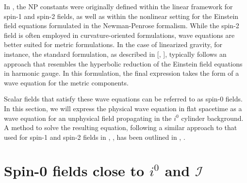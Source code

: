 In \cite{NewPen68}, the NP constants were originally defined within the linear framework for spin-1 and spin-2 fields, as well as within the nonlinear setting for the Einstein field equations formulated in the Newman-Penrose formalism.
While the spin-2 field is often employed in curvature-oriented formulations, wave equations are better suited for metric formulations. In the case of linearized gravity, for instance, the standard formulation, as described in [\cite{Mag07a}, \cite{Wal84a}], typically follows an approach that resembles the hyperbolic reduction of the Einstein field equations in harmonic gauge. In this formulation, the final expression takes the form of a wave equation for the metric components. 

Scalar fields that satisfy these wave equations can be referred to as spin-0 fields. In this section, we will express the physical wave equation in flat spacetime as a wave equation for an unphysical field propagating in the $i^0$ cylinder background. A method to solve the resulting equation, following a similar approach to that used for spin-1 and spin-2 fields in \cite{Val07}, \cite{GasKro16d}, has been outlined in \cite{MinMacKro22}, \cite{GasPin23}.
\section{Spin-0 fields close to $i^0$ and $\mathscr{I}$}
\label{sec:Spin0FieldsCloseToI0AndI}

